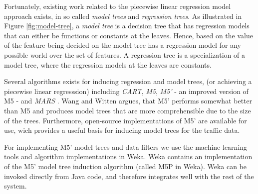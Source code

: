 Fortunately, existing work related to the piecewise linear regression model approach exists, in so called \emph{model trees} and \emph{regression trees}. As illustrated in Figure \ref{fig:model-tree}, a \emph{model tree} is a decision tree that has regression models that can either be functions or constants at the leaves. Hence, based on the value of the feature being decided on the model tree has a regression model for any possible world over the set of features. A regression tree is a specialization of a model tree, where the regression models at the leaves are constants.

Several algorithms exists for inducing regression and model trees, (or achieving a piecewise linear regresssion) including \emph{CART}, \emph{M5}, \emph{M5'} - an improved version of M5 - and \emph{MARS} . Wang and Witten\cite{IMTCC96} argues, that M5' performs somewhat better than M5 and produces model trees that are more comprehensible due to the size of the trees. Furthermore, open-source implementations of M5' are available for use, wich provides a useful basis for inducing model trees for the traffic data.

For implementing M5' model trees and data filters we use the machine learning tools and algorithm implementations in Weka\cite{Weka}. Weka contains an implementation of the M5' model tree induction algorithm (called M5P in Weka). Weka can be invoked directly from Java code, and therefore integrates well with the rest of the system.

